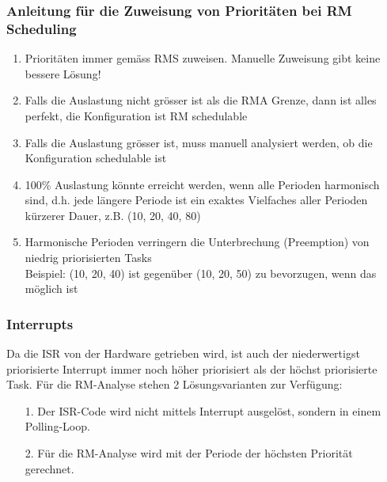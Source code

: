 \subsubsection{Anleitung für die Zuweisung von Prioritäten bei RM Scheduling}
\begin{enumerate}
  \item Prioritäten immer gemäss RMS zuweisen. Manuelle Zuweisung gibt keine bessere Lösung!
  \item Falls die Auslastung nicht grösser ist als die RMA Grenze, dann ist alles perfekt, die Konfiguration ist RM schedulable
  \item Falls die Auslastung grösser ist, muss manuell analysiert werden, ob die Konfiguration schedulable ist
  \item 100\% Auslastung könnte erreicht werden, wenn alle Perioden harmonisch sind, d.h. jede längere Periode ist ein exaktes Vielfaches aller Perioden kürzerer Dauer, z.B. (10, 20, 40, 80)
  \item Harmonische Perioden verringern die Unterbrechung (Preemption) von niedrig priorisierten Tasks\\
  Beispiel: (10, 20, 40) ist gegenüber (10, 20, 50) zu bevorzugen, wenn das möglich ist
\end{enumerate}


\subsubsection{Interrupts}
Da die ISR von der Hardware getrieben wird, ist auch der niederwertigst priorisierte Interrupt
immer noch höher priorisiert als der höchst priorisierte Task. Für die RM-Analyse stehen 2 Lösungsvarianten zur Verfügung:
\begin{itemize}
  \item[1.]  Der ISR-Code wird nicht mittels Interrupt ausgelöst, sondern in einem Polling-Loop.
  \item[2.]  Für die RM-Analyse wird mit der Periode der höchsten Priorität gerechnet.
\end{itemize}
